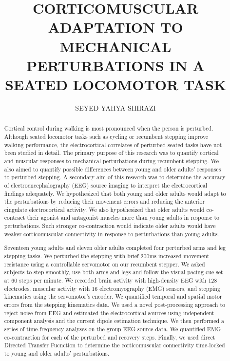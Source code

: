 \documentclass{UCF_ETD}
\title{\uppercase{Corticomuscular adaptation to mechanical perturbations in a seated locomotor task}} %
\author{\uppercase{Seyed Yahya Shirazi}} %
\begin{document}
\frontmatter

\maketitle


\begin{abstract}
    Cortical control during walking is most pronounced when the person is perturbed. Although seated locomotor tasks such as cycling or recumbent stepping improve walking performance, the electrocortical correlates of perturbed seated tasks have not been studied in detail. The primary purpose of this research was to quantify cortical and muscular responses to mechanical perturbations during recumbent stepping. We also aimed to quantify possible differences between young and older adults' responses to perturbed stepping. A secondary aim of this research was to determine the accuracy of electroencephalography (EEG) source imaging to interpret the electrocortical findings adequately. We hypothesized that both young and older adults would adapt to the perturbations by reducing their movement errors and reducing the anterior cingulate electrocortical activity. We also hypothesized that older adults would co-contract their agonist and antagonist muscles more than young adults in response to perturbations. Such stronger co-contraction would indicate older adults would have weaker corticomuscular connectivity in response to perturbations than young adults.

    Seventeen young adults and eleven older adults completed four perturbed arms and leg stepping tasks. We perturbed the stepping with brief 200ms increased movement resistance using a controllable servomotor on our recumbent stepper. We asked subjects to step smoothly, use both arms and legs and follow the visual pacing cue set at 60 steps per minute. We recorded brain activity with high-density EEG with 128 electrodes, muscular activity with 16 electromyography (EMG) sensors, and stepping kinematics using the servomotor's encoder. We quantified temporal and spatial motor errors from the stepping kinematics data. We used a novel post-processing approach to reject noise from EEG and estimated the electrocortical sources using independent component analysis and the current dipole estimation technique. We then performed a series of time-frequency analyses on the group EEG source data. We quantified EMG co-contraction for each of the perturbed and recovery steps. Finally, we used direct Directed Transfer Fucnction to determine the corticomuscular connectivity time-locked to young and older adults' perturbations.
    

\end{abstract}
\end{document}
